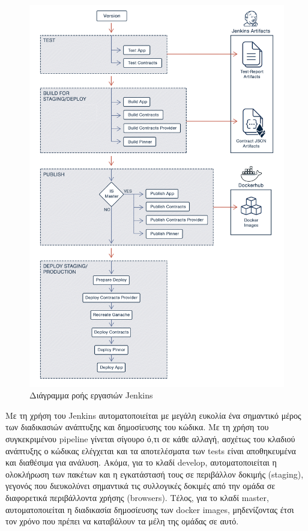 \begin{figure}[H]
    \centering
    \includegraphics[width=.8\textwidth]{assets/figures/chapter-4/4.1.implementation-methodology-jenkins-pipeline.png}
    \caption{Διάγραμμα ροής εργασιών Jenkins}
    \label{figure:4.1.implementation-methodology-jenkins-pipeline}
\end{figure}

Με τη χρήση του Jenkins αυτοματοποιείται με μεγάλη ευκολία ένα σημαντικό μέρος των διαδικασιών ανάπτυξης και δημοσίευσης του κώδικα. Με τη χρήση του συγκεκριμένου pipeline γίνεται σίγουρο ό,τι σε κάθε αλλαγή, ασχέτως του κλαδιού ανάπτυξης ο κώδικας ελέγχεται και τα αποτελέσματα των tests είναι αποθηκευμένα και διαθέσιμα για ανάλυση. Ακόμα, για το κλαδί develop, αυτοματοποιείται η ολοκλήρωση των πακέτων και η εγκατάστασή τους σε περιβάλλον δοκιμής (staging), γεγονός που διευκολύνει σημαντικά τις συλλογικές δοκιμές από την ομάδα σε διαφορετικά περιβάλλοντα χρήσης (browsers). Τέλος, για το κλαδί master, αυτοματοποιείται η διαδικασία δημοσίευσης των docker images, μηδενίζοντας έτσι τον χρόνο που πρέπει να καταβάλουν τα μέλη της ομάδας σε αυτό.
